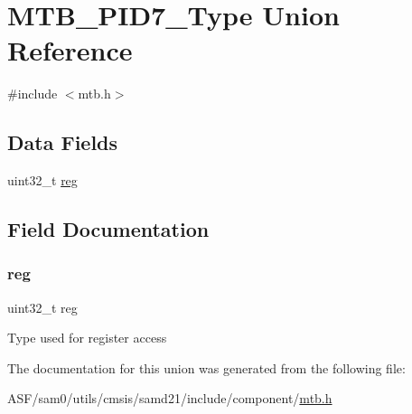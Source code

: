 \hypertarget{union_m_t_b___p_i_d7___type}{}\section{M\+T\+B\+\_\+\+P\+I\+D7\+\_\+\+Type Union Reference}
\label{union_m_t_b___p_i_d7___type}


{\ttfamily \#include $<$mtb.\+h$>$}

\subsection*{Data Fields}
\begin{DoxyCompactItemize}
\item 
uint32\+\_\+t \mbox{\hyperlink{union_m_t_b___p_i_d7___type_a6b91636401516a477989a336376d7b40}{reg}}
\end{DoxyCompactItemize}


\subsection{Field Documentation}
\mbox{\label{union_m_t_b___p_i_d7___type_a6b91636401516a477989a336376d7b40}} 
\subsubsection{\texorpdfstring{reg}{reg}}
{\footnotesize\ttfamily uint32\+\_\+t reg}

Type used for register access 

The documentation for this union was generated from the following file\+:\begin{DoxyCompactItemize}
\item 
A\+S\+F/sam0/utils/cmsis/samd21/include/component/\mbox{\hyperlink{component_2mtb_8h}{mtb.\+h}}\end{DoxyCompactItemize}
